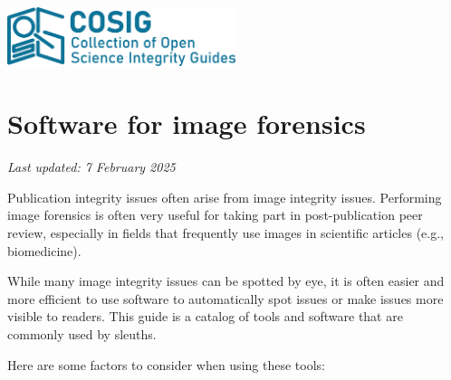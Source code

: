\documentclass[letterpaper, 12pt]{article}
\begin{document}
\flushleft
\includegraphics[width=0.5\textwidth]{img/home/241017_final_logo_mockup.png}

\section*{Software for image forensics}
\textit{Last updated: 7 February 2025}

Publication integrity issues often arise from image integrity issues. Performing image forensics is often very useful for taking part in post-publication peer review, especially in fields that frequently use images in scientific articles (e.g., biomedicine).

While many image integrity issues can be spotted by eye, it is often easier and more efficient to use software to automatically spot issues or make issues more visible to readers. This guide is a catalog of tools and software that are commonly used by sleuths.

Here are some factors to consider when using these tools:
\end{document}
